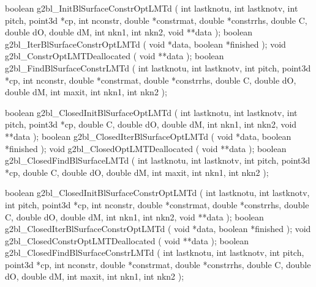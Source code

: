 \begin{listingC}
boolean g2bl_InitBlSurfaceConstrOptLMTd ( int lastknotu, int lastknotv, int
pitch,
                                          point3d *cp,
                                          int nconstr, double *constrmat,
                                          double *constrrhs,
                                          double C, double dO, double dM,
                                          int nkn1, int nkn2,
                                          void **data );
boolean g2bl_IterBlSurfaceConstrOptLMTd ( void *data, boolean *finished );
void g2bl_ConstrOptLMTDeallocated ( void **data );
boolean g2bl_FindBlSurfaceConstrLMTd ( int lastknotu, int lastknotv, int
pitch,
                                       point3d *cp,
                                       int nconstr, double *constrmat,
                                       double *constrrhs,
                                       double C, double dO, double dM,
                                       int maxit, int nkn1, int nkn2 );
\end{listingC}

\begin{listingC}
boolean g2bl_ClosedInitBlSurfaceOptLMTd ( int lastknotu, int lastknotv, int
pitch,
                                          point3d *cp,
                                          double C, double dO, double dM,
                                          int nkn1, int nkn2,
                                          void **data );
boolean g2bl_ClosedIterBlSurfaceOptLMTd ( void *data, boolean *finished );
void g2bl_ClosedOptLMTDeallocated ( void **data );
boolean g2bl_ClosedFindBlSurfaceLMTd ( int lastknotu, int lastknotv, int
pitch,
                                       point3d *cp,
                                       double C, double dO, double dM,
                                       int maxit, int nkn1, int nkn2 );
\end{listingC}

\begin{listingC}
boolean g2bl_ClosedInitBlSurfaceConstrOptLMTd (
                   int lastknotu, int lastknotv, int pitch, point3d *cp,
                   int nconstr, double *constrmat, double *constrrhs,   
                   double C, double dO, double dM, int nkn1, int nkn2,  
                   void **data );
boolean g2bl_ClosedIterBlSurfaceConstrOptLMTd ( void *data, boolean
*finished );
void g2bl_ClosedConstrOptLMTDeallocated ( void **data );
boolean g2bl_ClosedFindBlSurfaceConstrLMTd (
                   int lastknotu, int lastknotv, int pitch, point3d *cp,
                   int nconstr, double *constrmat, double *constrrhs,   
                   double C, double dO, double dM,
                   int maxit, int nkn1, int nkn2 );

\end{listingC}

